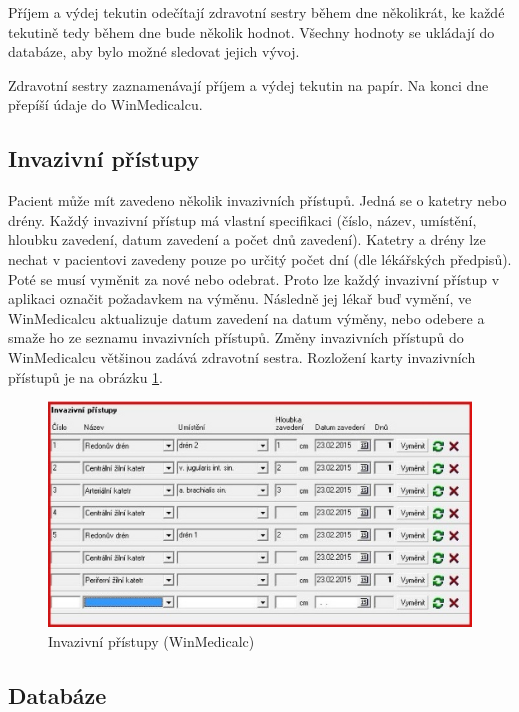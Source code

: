 Příjem a výdej tekutin odečítají zdravotní sestry během dne několikrát, ke každé tekutině tedy během dne bude několik hodnot. Všechny hodnoty se ukládají do databáze, aby bylo možné sledovat jejich vývoj.

Zdravotní sestry zaznamenávají příjem a výdej tekutin na papír. Na konci dne přepíší údaje do WinMedicalcu.

\subsection{Invazivní přístupy}

Pacient může mít zavedeno několik invazivních přístupů. Jedná se o katetry nebo drény. Každý invazivní přístup má vlastní specifikaci (číslo, název, umístění, hloubku zavedení, datum zavedení a počet dnů zavedení). Katetry a drény lze nechat v pacientovi zavedeny pouze po určitý počet dní (dle lékářských předpisů). Poté se musí vyměnit za nové nebo odebrat. Proto lze každý invazivní přístup v aplikaci označit požadavkem na výměnu. Následně jej lékař buď vymění, ve WinMedicalcu aktualizuje datum zavedení na datum výměny, nebo odebere a smaže ho ze seznamu invazivních přístupů. Změny invazivních přístupů do WinMedicalcu většinou zadává zdravotní sestra. Rozložení karty invazivních přístupů je na obrázku \ref{fig:WM_invazivni_pristupy}.

\begin{figure}[H]
	\centering
	\includegraphics[width=1\textwidth]{img/medicalc/WM_invazivni_pristupy.eps}
	\caption{Invazivní přístupy (WinMedicalc)}
  \label{fig:WM_invazivni_pristupy}
\end{figure}


\subsection{Databáze}

